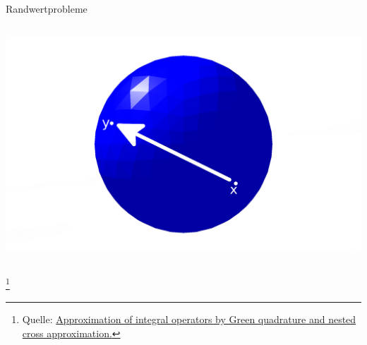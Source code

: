 \documentclass[10pt]{beamer}
\let\svthefootnote\thefootnote
\begin{document}
\begin{frame}{Randwertprobleme}
\begin{columns}
\begin{overprint}
        \includegraphics[width=1.5\linewidth]{figures/fg-sphere-full-inf.pdf}
      \end{overprint}

  \end{columns}
  \footnotesize
  \let\thefootnote\relax\footnote{Quelle: \href{https://link.springer.com/article/10.1007\%2Fs00211-015-0757-y}{Approximation of integral operators by Green quadrature and nested cross approximation.}}
  \addtocounter{footnote}{-1}\let\thefootnote\svthefootnote\relax
  \normalsize
\end{frame}
\end{document}
